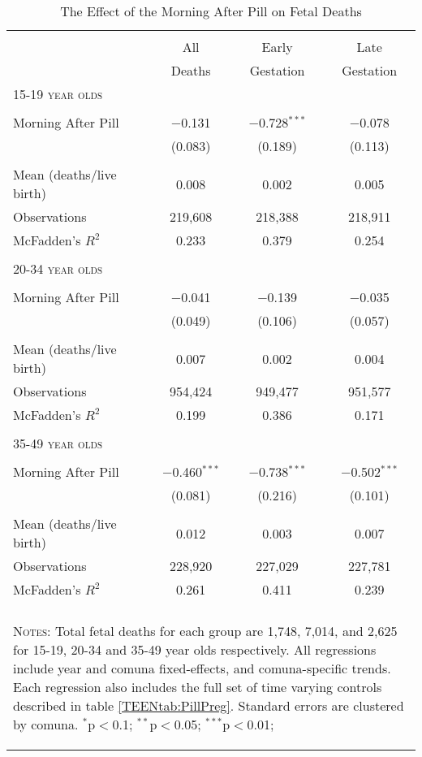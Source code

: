 \begin{table}[htpb!] \centering
\caption{The Effect of the Morning After Pill on Fetal Deaths}
\label{TEENtab:PillDeath}
\begin{tabular}{@{\extracolsep{5pt}}lccc}\\[-1.8ex]
\hline\hline\\[-1.8ex]
& All & Early & Late \\
& Deaths & Gestation & Gestation \\ \midrule
\multicolumn{4}{l}{\textsc{15-19 year olds}} \\
&&&\\
Morning After Pill &$-$0.131&$-$0.728$^{***}$&$-$0.078\\
&(0.083)&(0.189)&(0.113)\\
&&&\\
Mean (deaths/live birth)&0.008&0.002&0.005\\
Observations&219,608&218,388&218,911\\
McFadden's $R^2$&0.233&0.379&0.254\\
&&&\\
\multicolumn{4}{l}{\textsc{20-34 year olds}} \\
&&&\\
Morning After Pill &$-$0.041&$-$0.139&$-$0.035\\
&(0.049)&(0.106)&(0.057)\\
&&&\\
Mean (deaths/live birth)&0.007&0.002&0.004\\
Observations&954,424&949,477&951,577\\
McFadden's $R^2$&0.199&0.386&0.171\\
&&&\\
\multicolumn{4}{l}{\textsc{35-49 year olds}} \\
&&&\\
Morning After Pill &$-$0.460$^{***}$&$-$0.738$^{***}$&$-$0.502$^{***}$\\
&(0.081)&(0.216)&(0.101)\\
&&&\\
Mean (deaths/live birth)&0.012&0.003&0.007\\
Observations&228,920&227,029&227,781\\
McFadden's $R^2$&0.261&0.411&0.239\\
\hline \hline \\[-1.8ex]
\multicolumn{4}{p{10cm}}{\begin{footnotesize}\textsc{Notes:}
Total fetal deaths for each group are
1,748, 7,014, and 2,625
 for 15-19, 20-34 and 35-49 year olds respectively.  All
regressions include year and comuna fixed-effects, and
comuna-specific trends.  Each regression also includes the
full set of time varying controls described in table
\ref{TEENtab:PillPreg}.  Standard errors are clustered by
comuna.
$^{*}$p$<$0.1; $^{**}$p$<$0.05; $^{***}$p$<$0.01;\end{footnotesize}}
\normalsize\end{tabular}\end{table}
